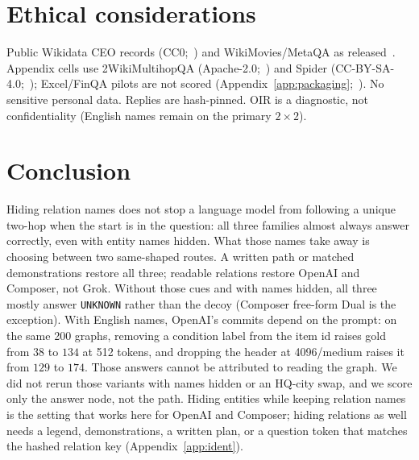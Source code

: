 \documentclass{article}
\begin{document}
\section*{Ethical considerations}

Public Wikidata CEO records (CC0;~\citealp{vrandecic2014wikidata}) and
WikiMovies/MetaQA as released~\citep{miller2016wikimovies,zhang2018metaqa}.
Appendix cells use 2WikiMultihopQA (Apache-2.0;~\citealp{ho2020constructing})
and Spider (CC-BY-SA-4.0;~\citealp{yu2018spider}); Excel/FinQA pilots are
not scored (Appendix~\ref{app:packaging};~\citealp{chen2021finqa}).
No sensitive personal data. Replies are hash-pinned.
OIR is a diagnostic, not confidentiality (English names remain on the
primary $2{\times}2$).

\section{Conclusion}

Hiding relation names does not stop a language model from following a
unique two-hop when the start is in the question: all three families
almost always answer correctly, even with entity names hidden.
What those names take away is choosing between two same-shaped routes.
A written path or matched demonstrations restore all three; readable
relations restore OpenAI and Composer, not Grok.
Without those cues and with names hidden, all three mostly answer
\texttt{UNKNOWN} rather than the decoy (Composer free-form Dual is the
exception).
With English names, OpenAI's commits depend on the prompt: on the same
200 graphs, removing a condition label from the item id raises gold from
$38$ to $134$ at 512 tokens, and dropping the header at 4096/medium
raises it from $129$ to $174$.
Those answers cannot be attributed to reading the graph.
We did not rerun those variants with names hidden or an HQ-city swap, and
we score only the answer node, not the path.
Hiding entities while keeping relation names is the setting that works
here for OpenAI and Composer; hiding relations as well needs a legend,
demonstrations, a written plan, or a question token that matches the
hashed relation key (Appendix~\ref{app:ident}).
\end{document}
